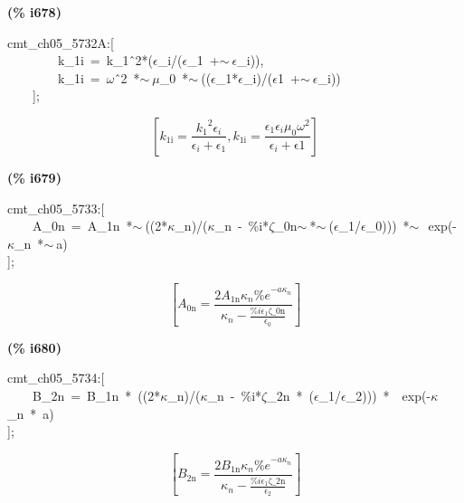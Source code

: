 \documentclass[fleqn]{article}
\begin{document}
\noindent
\begin{minipage}[t]{4.000000em}\color{red}\bfseries
(\% i678)	
\end{minipage}
\begin{minipage}[t]{\textwidth}\color{blue}
cmt\_ch05\_5732A:[\\
\ \ \ \ \ \ \ \ k\_1i\ =\ k\_1\^\ 2*(\ensuremath{\epsilon}\_i/(\ensuremath{\epsilon}\_1\ +\ensuremath{\sim\ }\ensuremath{\epsilon}\_i)),\\
\ \ \ \ \ \ \ \ k\_1i\ =\ \ensuremath{\omega}\^\ 2\ *\ensuremath{\sim\ }\ensuremath{\mu}\_0\ *\ensuremath{\sim\ }((\ensuremath{\epsilon}\_1*\ensuremath{\epsilon}\_i)/(\ensuremath{\epsilon}1\ +\ensuremath{\sim\ }\ensuremath{\epsilon}\_i))\ \ \ \ \\
\ \ \ \ ];
\end{minipage}
\[\displaystyle \tag{\% o678} 
\left[ {k_{\ensuremath{\mathrm{1i}}}}=\frac{{{{k_1}}^{2}} {{\epsilon }_i}}{{{\epsilon }_i}+{{\epsilon }_1}}\operatorname{,}{k_{\ensuremath{\mathrm{1i}}}}=\frac{{{\epsilon }_1} {{\epsilon }_i} {{\mu }_0} {{\omega }^{2}}}{{{\epsilon }_i}+\ensuremath{\mathrm{\epsilon 1}}}\right] \mbox{}
\]


\noindent
\begin{minipage}[t]{4.000000em}\color{red}\bfseries
(\% i679)	
\end{minipage}
\begin{minipage}[t]{\textwidth}\color{blue}
cmt\_ch05\_5733:[\\
\ \ \ \ A\_0n\ =\ A\_1n\ *\ensuremath{\sim\ }((2*\ensuremath{\kappa}\_n)/(\ensuremath{\kappa}\_n\ -\ \%i*\ensuremath{\zeta}\_0n\ensuremath{\sim\ }*\ensuremath{\sim\ }(\ensuremath{\epsilon}\_1/\ensuremath{\epsilon}\_0)))\ *\ensuremath{\sim\ }\ exp(-\ensuremath{\kappa}\_n\ *\ensuremath{\sim\ }a)\\
];
\end{minipage}
\[\displaystyle \tag{\% o679} 
\left[ {A_{\ensuremath{\mathrm{0n}}}}=\frac{2 {A_{\ensuremath{\mathrm{1n}}}} {{\kappa }_n} {{\% e}^{-a {{\kappa }_n}}}}{{{\kappa }_n}-\frac{\% i {{\epsilon }_1} \ensuremath{\mathrm{\zeta \_ 0n}}}{{{\epsilon }_0}}}\right] \mbox{}
\]


\noindent
\begin{minipage}[t]{4.000000em}\color{red}\bfseries
(\% i680)	
\end{minipage}
\begin{minipage}[t]{\textwidth}\color{blue}
cmt\_ch05\_5734:[\\
\ \ \ \ B\_2n\ =\ B\_1n\ *\ ((2*\ensuremath{\kappa}\_n)/(\ensuremath{\kappa}\_n\ -\ \%i*\ensuremath{\zeta}\_2n\ *\ (\ensuremath{\epsilon}\_1/\ensuremath{\epsilon}\_2)))\ *\ \ exp(-\ensuremath{\kappa}\_n\ *\ a)\\
];
\end{minipage}
\[\displaystyle \tag{\% o680} 
\left[ {B_{\ensuremath{\mathrm{2n}}}}=\frac{2 {B_{\ensuremath{\mathrm{1n}}}} {{\kappa }_n} {{\% e}^{-a {{\kappa }_n}}}}{{{\kappa }_n}-\frac{\% i {{\epsilon }_1} \ensuremath{\mathrm{\zeta \_ 2n}}}{{{\epsilon }_2}}}\right] \mbox{}
\]
\end{document}
